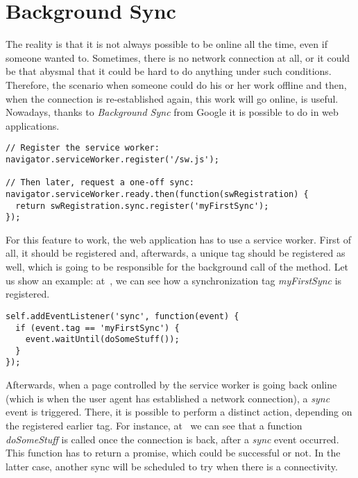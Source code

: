 \section{Background Sync}
\label{BackgroundSync}

The reality is that it is not always possible to be online all the time, even if someone wanted to. Sometimes, there is no network connection at all, or it could be that abysmal that it could be hard to do anything under such conditions. Therefore, the scenario when someone could do his or her work offline and then, when the connection is re-established again, this work will go online, is useful. Nowadays, thanks to \textit{Background Sync}\cite{38} from Google it is possible to do in web applications. 

\begin{lstlisting}[caption={[Code for registration of a sync event for a Service Worker]Code, which demonstrates how to register sync (\textit{myFirstSync} here) event for the service worker\cite{38}.}, label={lst:tech8}]
// Register the service worker:
navigator.serviceWorker.register('/sw.js');

// Then later, request a one-off sync:
navigator.serviceWorker.ready.then(function(swRegistration) {
  return swRegistration.sync.register('myFirstSync');
});
\end{lstlisting} 

For this feature to work, the web application has to use a service worker. First of all, it should be registered and, afterwards, a unique tag should be registered as well, which is going to be responsible for the background call of the method. Let us show an example: at~, we can see how a synchronization tag \textit{myFirstSync} is registered.

\begin{lstlisting}[caption={[Code for calling a specific function when sync event triggered]Code, which demonstates that a function \textit{doSomeStuff} called, when the \textit{sync} event happened\cite{38}.}, label={lst:tech9}]
self.addEventListener('sync', function(event) {
  if (event.tag == 'myFirstSync') {
    event.waitUntil(doSomeStuff());
  }
});
\end{lstlisting} 

Afterwards, when a page controlled by the service worker is going back online (which is when the user agent has established a network connection\cite{44}), a \textit{sync} event is triggered. There, it is possible to perform a distinct action, depending on the registered earlier tag. For instance, at~ we can see that a function \textit{doSomeStuff} is called once the connection is back, after a \textit{sync} event occurred. This function has to return a promise, which could be successful or not. In the latter case, another sync will be scheduled to try when there is a connectivity\cite{38}. 


